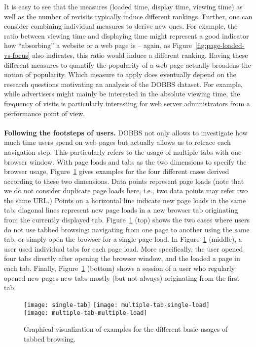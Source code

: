 \documentclass[11pt,fleqn,twoside]{article}
\begin{document}
It is easy to see that the measures (loaded time, display time, viewing time) as well as the number of revisits typically induce different rankings. Further, one can consider combining individual measures to derive new ones. For example, the ratio between viewing time and displaying time might represent a good indicator how ``absorbing'' a website or a web page is -- again, as Figure~\ref{fig:page-loaded-vs-focus} also indicates, this ratio would induce a different ranking. Having these different measures to quantify the popularity of a web page actually broadens the notion of popularity. Which measure to apply does eventually depend on the research questions motivating an analysis of the DOBBS dataset. For example, while advertisers might mainly be interested in the absolute viewing time, the frequency of visits is particularly interesting for web server administrators from a performance point of view.
\\
\\
\textbf{Following the footsteps of users.}
DOBBS not only allows to investigate how much time users spend on web pages but actually allows us to retrace each navigation step. This particularly refers to the usage of multiple tabs with one browser window. With page loads and tabs as the two dimensions to specify the browser usage, Figure~\ref{fig:graph-session-history} gives examples for the four different cases derived according to these two dimensions. Data points represent page loads (note that we do not consider duplicate page loads here, i.e., two data points may refer two the same URL.) Points on a horizontal line indicate new page loads in the same tab; diagonal lines represent new page loads in a new browser tab originating from the currently displayed tab. Figure~\ref{fig:graph-session-history} (top) shows the two cases where users do not use tabbed browsing: navigating from one page to another using the same tab, or simply open the browser for a single page load. In Figure~\ref{fig:graph-session-history} (middle), a user used individual tabs 
for each page load. More specifically, the user opened four tabs directly after opening the browser window, and the loaded a page in each tab. Finally, Figure~\ref{fig:graph-session-history} (bottom) shows a session of a user who regularly opened new pages new tabs mostly (but not always) originating from the first tab.
\begin{figure}
	\centering
		\texttt{[image: single-tab]}
		\texttt{[image: multiple-tab-single-load]}
		\texttt{[image: multiple-tab-multiple-load]}
	\caption{Graphical visualization of examples for the different basic usages of tabbed browsing.}
	\label{fig:graph-session-history}
\end{figure}
\end{document}
